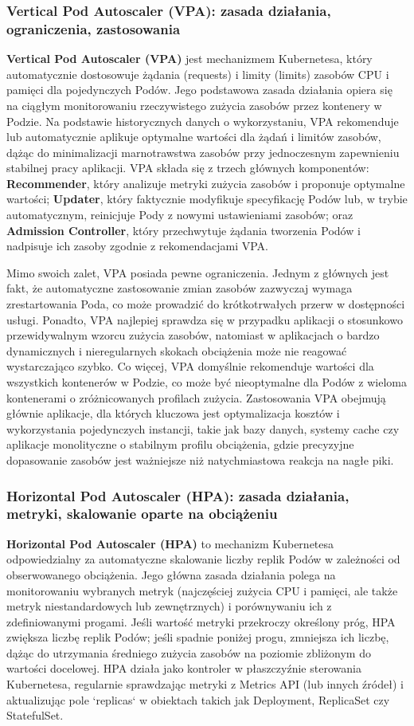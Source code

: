 \subsubsection{Vertical Pod Autoscaler (VPA): zasada działania, ograniczenia, zastosowania}
\textbf{Vertical Pod Autoscaler (VPA)} jest mechanizmem Kubernetesa, który automatycznie dostosowuje żądania (requests) i limity (limits) zasobów CPU i pamięci dla pojedynczych Podów. Jego podstawowa zasada działania opiera się na ciągłym monitorowaniu rzeczywistego zużycia zasobów przez kontenery w Podzie. Na podstawie historycznych danych o wykorzystaniu, VPA rekomenduje lub automatycznie aplikuje optymalne wartości dla żądań i limitów zasobów, dążąc do minimalizacji marnotrawstwa zasobów przy jednoczesnym zapewnieniu stabilnej pracy aplikacji. VPA składa się z trzech głównych komponentów: \textbf{Recommender}, który analizuje metryki zużycia zasobów i proponuje optymalne wartości; \textbf{Updater}, który faktycznie modyfikuje specyfikację Podów lub, w trybie automatycznym, reinicjuje Pody z nowymi ustawieniami zasobów; oraz \textbf{Admission Controller}, który przechwytuje żądania tworzenia Podów i nadpisuje ich zasoby zgodnie z rekomendacjami VPA.

Mimo swoich zalet, VPA posiada pewne ograniczenia. Jednym z głównych jest fakt, że automatyczne zastosowanie zmian zasobów zazwyczaj wymaga zrestartowania Poda, co może prowadzić do krótkotrwałych przerw w dostępności usługi. Ponadto, VPA najlepiej sprawdza się w przypadku aplikacji o stosunkowo przewidywalnym wzorcu zużycia zasobów, natomiast w aplikacjach o bardzo dynamicznych i nieregularnych skokach obciążenia może nie reagować wystarczająco szybko. Co więcej, VPA domyślnie rekomenduje wartości dla wszystkich kontenerów w Podzie, co może być nieoptymalne dla Podów z wieloma kontenerami o zróżnicowanych profilach zużycia. Zastosowania VPA obejmują głównie aplikacje, dla których kluczowa jest optymalizacja kosztów i wykorzystania pojedynczych instancji, takie jak bazy danych, systemy cache czy aplikacje monolityczne o stabilnym profilu obciążenia, gdzie precyzyjne dopasowanie zasobów jest ważniejsze niż natychmiastowa reakcja na nagłe piki.

\subsubsection{Horizontal Pod Autoscaler (HPA): zasada działania, metryki, skalowanie oparte na obciążeniu}
\textbf{Horizontal Pod Autoscaler (HPA)} to mechanizm Kubernetesa odpowiedzialny za automatyczne skalowanie liczby replik Podów w zależności od obserwowanego obciążenia. Jego główna zasada działania polega na monitorowaniu wybranych metryk (najczęściej zużycia CPU i pamięci, ale także metryk niestandardowych lub zewnętrznych) i porównywaniu ich z zdefiniowanymi progami. Jeśli wartość metryki przekroczy określony próg, HPA zwiększa liczbę replik Podów; jeśli spadnie poniżej progu, zmniejsza ich liczbę, dążąc do utrzymania średniego zużycia zasobów na poziomie zbliżonym do wartości docelowej. HPA działa jako kontroler w płaszczyźnie sterowania Kubernetesa, regularnie sprawdzając metryki z Metrics API (lub innych źródeł) i aktualizując pole `replicas` w obiektach takich jak Deployment, ReplicaSet czy StatefulSet.

